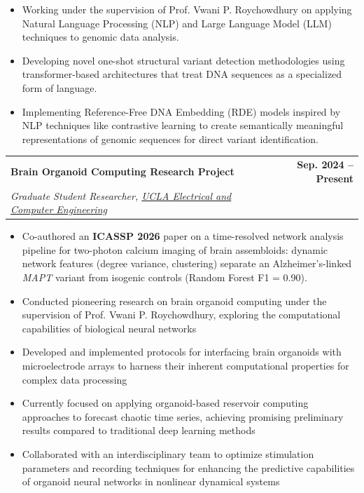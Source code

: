 \documentclass[letterpaper,11pt]{article}
\makeatletter
\newcommand{\resumeItem}[1]{
  \item\small{
    {#1 \vspace{1.2pt}}
  }
}
\newcommand{\resumeSubheading}[4]{
  \vspace{5pt}\item
    \begin{tabular*}{1.0\textwidth}[t]{l@{\extracolsep{\fill}}r}
      \textbf{#1} & \textbf{\small #2} \\
      \emph{\small#3} & \emph{\small #4} \\
    \end{tabular*}\vspace{-5pt}
}
\newcommand{\resumeItemListStart}{\begin{itemize}}
\newcommand{\resumeItemListEnd}{\end{itemize}\vspace{-5pt}}
\makeatother
\begin{document}
        \resumeItemListStart
            \resumeItem{Working under the supervision of Prof. Vwani P. Roychowdhury on applying Natural Language Processing (NLP) and Large Language Model (LLM) techniques to genomic data analysis.} \\
            \resumeItem{Developing novel one-shot structural variant detection methodologies using transformer-based architectures that treat DNA sequences as a specialized form of language.} \\
            \resumeItem{Implementing Reference-Free DNA Embedding (RDE) models inspired by NLP techniques like contrastive learning to create semantically meaningful representations of genomic sequences for direct variant identification.} \\
        \resumeItemListEnd
        \resumeSubheading{Brain Organoid Computing Research Project}{Sep. 2024 -- Present}{Graduate Student Researcher, \href{https://www.ee.ucla.edu/}{UCLA Electrical and Computer Engineering}}{}
        \resumeItemListStart
            \resumeItem{Co-authored an \textbf{ICASSP 2026} paper on a time-resolved network analysis pipeline for two-photon calcium imaging of brain assembloids: dynamic network features (degree variance, clustering) separate an Alzheimer's-linked \emph{MAPT} variant from isogenic controls (Random Forest F1 = 0.90).} \\
            \resumeItem{Conducted pioneering research on brain organoid computing under the supervision of Prof. Vwani P. Roychowdhury, exploring the computational capabilities of biological neural networks} \\
            \resumeItem{Developed and implemented protocols for interfacing brain organoids with microelectrode arrays to harness their inherent computational properties for complex data processing} \\
            \resumeItem{Currently focused on applying organoid-based reservoir computing approaches to forecast chaotic time series, achieving promising preliminary results compared to traditional deep learning methods} \\
            \resumeItem{Collaborated with an interdisciplinary team to optimize stimulation parameters and recording techniques for enhancing the predictive capabilities of organoid neural networks in nonlinear dynamical systems} \\
        \resumeItemListEnd
\end{document}
